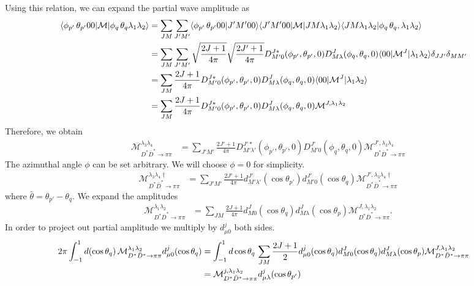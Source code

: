 \documentclass[aps,prd,preprintnumbers,showpacs,showkeys,nofootinbib,
superscriptaddress,fleqn,floatfix,tightenlines, 10pt]{revtex4-1}
\begin{document}
Using this relation, we can expand the partial wave amplitude as
\begin{align}
	\langle \phi_{p'}\,\theta_{p'}00| \mathcal{M} | \phi_q\,\theta_q\lambda_1 \lambda_2 \rangle &= \sum_{JM} \sum_{J'M'}
	\langle \phi_{p'}\,\theta_{p'} 00 | J'M'00 \rangle \langle J'M'00 | \mathcal{M} | JM \lambda_1 \lambda_2 \rangle
	\langle JM \lambda_1 \lambda_2 | \phi_q\,\theta_q, \lambda_1 \lambda_2 \rangle \cr
	&= \sum_{JM} \sum_{J'M'} \sqrt{\frac{2J+1}{4\pi}} \sqrt{\frac{2J'+1}{4\pi}}
	D^{J*}_{M' 0} (\phi_{p'}, \theta_{p'}, 0) D^{J}_{M \lambda} (\phi_q, \theta_q, 0)
	\langle 00 | \mathcal{M}^J | \lambda_1 \lambda_2 \rangle \delta_{JJ'} \delta_{MM'} \cr
	&= \sum_{JM} \frac{2J+1}{4\pi} D^{J*}_{M' 0} (\phi_{p'}, \theta_{p'}, 0) D^{J}_{M \lambda} (\phi_q, \theta_q, 0)
	\langle 00 | \mathcal{M}^J | \lambda_1 \lambda_2 \rangle  \cr
	&= \sum_{JM} \frac{2J+1}{4\pi} D^{J*}_{M' 0} (\phi_{p'}, \theta_{p'}, 0) D^{J}_{M \lambda} (\phi_q, \theta_q, 0)
	\mathcal{M}^{J,\lambda_1 \lambda_2}
\end{align}
Therefore, we obtain
\begin{align}
	\mathcal{M}_{D^* \bar{D}^* \rightarrow \pi \pi}^{\lambda_3 \lambda_4} &=
	\sum_{J'M'} \frac{2J'+1}{4\pi} D^{J'*}_{M' \lambda'} (\phi_{p'}, \theta_{p'}, 0) D^{J'}_{M' 0} (\phi_q, \theta_q, 0)
	\mathcal{M}_{D^* \bar{D}^*\rightarrow \pi\pi}^{J',\lambda_3 \lambda_4}
\end{align}
The azimuthal angle $\phi$ can be set arbitrary. We will choose $\phi=0$ for simplicity.
\begin{align}
	\mathcal{M}_{D^* \bar{D}^* \rightarrow \pi \pi}^{\lambda_3 \lambda_4 \dagger} &=
	\sum_{J'M'} \frac{2J'+1}{4\pi} d_{M' \lambda'}^{J'} (\cos{\theta_{p'}}) d_{M' 0}^{J'}(\cos{\theta_q})
	\mathcal{M}_{D^* \bar{D}^*\rightarrow \pi\pi}^{J',\lambda_3 \lambda_4 \dagger}
\end{align}
where $\bar{\theta} = \theta_{p'} - \theta_{q}$. We expand the amplitudes
\begin{align} \label{dstrpi_partial}
	\mathcal{M}_{D^* \bar{D}^* \rightarrow \pi \pi}^{\lambda_1 \lambda_2} &=
	\sum_{JM} \frac{2J+1}{4\pi} d_{M0}^J(\cos{\theta_q}) d_{M\lambda}^J(\cos{\theta_p})
	\mathcal{M}_{D^* \bar{D}^* \rightarrow \pi\pi}^{J,\lambda_1 \lambda_2}.
\end{align}
In order to project out partial amplitude we multiply by $d_{\mu0}^j$ both sides.
\begin{align}
	2\pi \int_{-1}^{1} d(\cos{\theta_q})
	\,\mathcal{M}_{D^* \bar{D}^* \rightarrow \pi\pi}^{\lambda_1 \lambda_2}
	d_{\mu0}^j(\cos{\theta_q})
	&= \int_{-1}^{1} d\cos{\theta_q}\,\sum_{JM} \frac{2J+1}{2}
	d_{\mu0}^j(\cos{\theta_q}) d_{M0}^J(\cos{\theta_q}) d_{M\lambda}^J(\cos{\theta_p})
	\mathcal{M}_{D^* \bar{D}^* \rightarrow \pi\pi}^{J,\lambda_1 \lambda_2} \cr
	&= \mathcal{M}_{D^* \bar{D}^* \rightarrow \pi\pi}^{j,\lambda_1 \lambda_2}
	d_{\mu\lambda}^j(\cos{\theta_{p'}})
\end{align}
\end{document}
